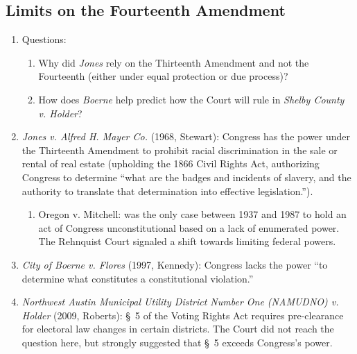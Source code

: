 \subsection{Limits on the Fourteenth Amendment}

\begin{enumerate}
    \item Questions:
    \begin{enumerate}
        \item Why did \emph{Jones} rely on the Thirteenth Amendment and not 
        the Fourteenth (either under equal protection or due process)?
        \item How does \emph{Boerne} help predict how the Court will rule in 
        \emph{Shelby County v. Holder}?
    \end{enumerate}
    \item \emph{Jones v. Alfred H. Mayer Co. } (1968, Stewart): Congress has the 
    power under the Thirteenth Amendment to prohibit racial discrimination in 
    the sale or rental of real estate (upholding the 1866 Civil Rights Act, 
    authorizing Congress to determine ``what are the badges and incidents of 
    slavery, and the authority to translate that determination into effective 
    legislation.'').
    \begin{enumerate}
        \item Oregon v. Mitchell: was the only case between 1937 and 1987 to 
        hold an act of Congress unconstitutional based on a lack of enumerated 
        power. The Rehnquist Court signaled a shift towards limiting federal 
        powers.
    \end{enumerate}
    \item \emph{City of Boerne v. Flores} (1997, Kennedy): Congress lacks the 
    power ``to determine what constitutes a constitutional violation.''
    \item \emph{Northwest Austin Municipal Utility District Number One 
    (NAMUDNO) v. Holder} (2009, Roberts): \S\ 5 of the Voting Rights Act 
    requires pre-clearance for electoral law changes in certain districts. The 
    Court did not reach the question here, but strongly suggested that \S\ 5 
    exceeds Congress's power.
\end{enumerate}
